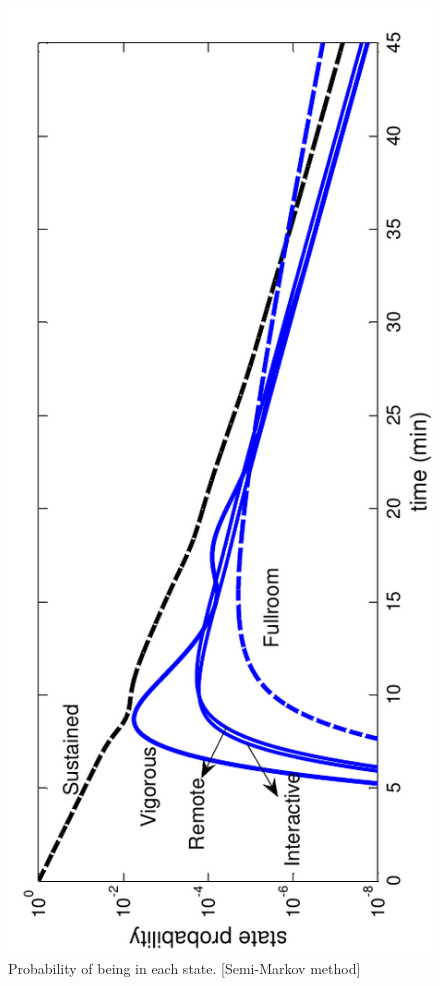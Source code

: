 \documentclass[12pt]{asme2ej}
\begin{document}
\begin{figure}[h!] \centering
  \includegraphics[scale=0.8, angle=-90]{FireStateProbs}
  \caption{Probability of being in each state. [Semi-Markov method]\label{fig:FireStateProbs}} 
\end{figure}
\end{document}
